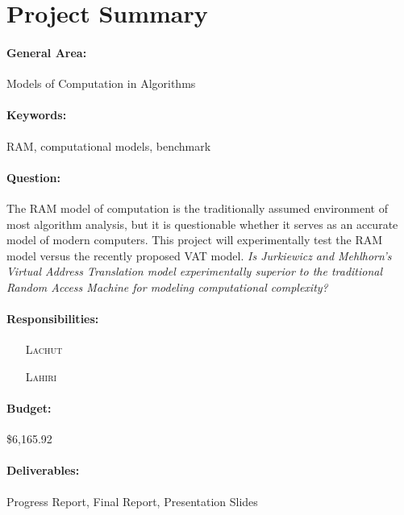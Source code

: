 \maketitle

\section{Project Summary}

\paragraph{General Area:} Models of Computation in Algorithms

\paragraph{Keywords:} RAM, computational models, benchmark

\paragraph{Question:} The RAM model of computation is the traditionally
assumed environment of most algorithm analysis, but it is questionable whether
it serves as an accurate model of modern computers. This project will
experimentally test the RAM model versus the recently proposed VAT model.
\emph{Is Jurkiewicz and Mehlhorn's Virtual Address Translation model
experimentally superior to the traditional Random Access Machine for modeling
computational complexity?}

\paragraph{Responsibilities:}
  \begin{itemize}
    \item[\textsc{Lachut}] 
    \item[\textsc{Lahiri}] 
  \end{itemize}

\paragraph{Budget:} \$6,165.92

\paragraph{Deliverables:} Progress Report, Final Report, Presentation Slides